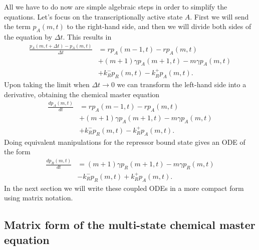 All we have to do now are simple algebraic steps in order to simplify the 
equations. Let's focus on the transcriptionally active state $A$. First we will
send the term $p_A(m, t)$ to the right-hand side, and then we will divide both
sides of the equation by $\Delta t$. This results in
\begin{equation}
\begin{aligned}
\frac{p_A(m, t + \Delta t) - p_A(m, t)}{\Delta t} &=
r p_A(m-1, t) - r p_A(m, t)\\
&+ (m+1)\gamma p_A(m+1, t)
- m \gamma p_A(m, t)\\
&+k_R^- p_R(m, t)
-k_R^+ p_A(m, t).
\end{aligned}
\end{equation}
Upon taking the limit when $\Delta t \rightarrow 0$ we can transform the 
left-hand side into a derivative, obtaining the chemical master equation
\begin{equation}
\begin{aligned}
\frac{d p_A(m, t)}{dt} &=
r p_A(m-1, t) - r p_A(m, t)\\
&+ (m+1)\gamma p_A(m+1, t)
- m \gamma p_A(m, t)\\
&+k_R^- p_R(m, t)
-k_R^+ p_A(m, t).
\end{aligned}
\end{equation}
Doing equivalent manipulations for the repressor bound state gives an ODE of the
form
\begin{equation}
\begin{aligned}
\frac{d p_R(m, t)}{dt} &=
(m+1)\gamma p_R(m+1, t)
- m \gamma p_R(m, t)\\
&-k_R^- p_R(m, t)
+k_R^+ p_A(m, t).
\end{aligned}
\end{equation}
In the next section we will write these coupled ODEs in a more compact form using
matrix notation.

\subsection{Matrix form of the multi-state chemical master equation}

